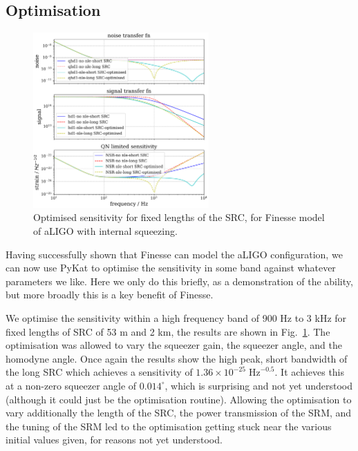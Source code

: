 \documentclass[aps,pra,superscriptaddress,reprint,nofootinbib]{revtex4-1}
\begin{document}
\subsection{Optimisation}

\begin{figure}
	\begin{center}
	\includegraphics[width=0.6\textwidth]{figures/aLIGO_optimum_sensitivity_comparison.pdf}
	\end{center}
	\caption{Optimised sensitivity for fixed lengths of the SRC, for Finesse model of aLIGO with internal squeezing.}
	\label{fig:aLIGO_optimum_sensitivity_comparison}
\end{figure}

Having successfully shown that Finesse can model the aLIGO configuration, we can now use PyKat to optimise the sensitivity in some band against whatever parameters we like. Here we only do this briefly, as a demonstration of the ability, but more broadly this is a key benefit of Finesse.


We optimise the sensitivity within a high frequency band of 900 Hz to 3 kHz for fixed lengths of SRC of 53 m and 2 km, the results are shown in Fig.~\ref{fig:aLIGO_optimum_sensitivity_comparison}. The optimisation was allowed to vary the squeezer gain, the squeezer angle, and the homodyne angle. Once again the results show the high peak, short bandwidth of the long SRC which achieves a sensitivity of $1.36 \times 10^{-25}\; \mathrm{Hz}^{-0.5}$. It achieves this at a non-zero squeezer angle of $0.014^\circ$, which is surprising and not yet understood (although it could just be the optimisation routine). Allowing the optimisation to vary additionally the length of the SRC, the power transmission of the SRM, and the tuning of the SRM led to the optimisation getting stuck near the various initial values given, for reasons not yet understood.
\end{document}
